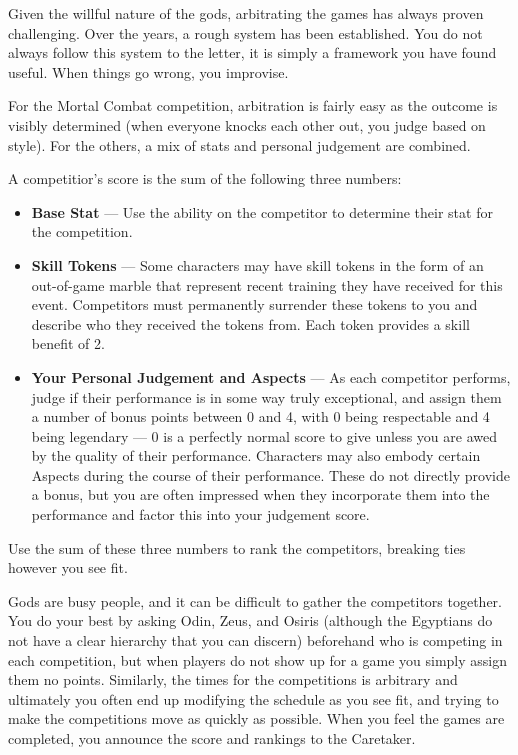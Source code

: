 \documentclass[green]{guardians}
\begin{document}
\name{\gArbiter{}}

Given the willful nature of the gods, arbitrating the games has always proven challenging. Over the years, a rough system has been established. You do not always follow this system to the letter, it is simply a framework you have found useful. When things go wrong, you improvise.

For the Mortal Combat competition, arbitration is fairly easy as the outcome is visibly determined (when everyone knocks each other out, you judge based on style). For the others, a mix of stats and personal judgement are combined.

A competitior's score is the sum of the following three numbers:

\begin{itemize}
  \item \textbf{Base Stat} --- Use the \aExamine{} ability on the competitor to determine their stat for the competition.
  \item \textbf{Skill Tokens} --- Some characters may have skill tokens in the form of an out-of-game marble that represent recent training they have received for this event. Competitors must permanently surrender these tokens to you and describe who they received the tokens from. Each token provides a skill benefit of 2.
  \item \textbf{Your Personal Judgement and Aspects} --- As each competitor performs, judge if their performance is in some way truly exceptional, and assign them a number of bonus points between 0 and 4, with 0 being respectable and 4 being legendary --- 0 is a perfectly normal score to give unless you are awed by the quality of their performance. Characters may also embody certain Aspects during the course of their performance. These do not directly provide a bonus, but you are often impressed when they incorporate them into the performance and factor this into your judgement score.
	
\end{itemize}

Use the sum of these three numbers to rank the competitors, breaking ties however you see fit.

Gods are busy people, and it can be difficult to gather the competitors together. You do your best by asking Odin, Zeus, and Osiris (although the Egyptians do not have a clear hierarchy that you can discern) beforehand who is competing in each competition, but when players do not show up for a game you simply assign them no points. Similarly, the times for the competitions is arbitrary and ultimately you often end up modifying the schedule as you see fit, and trying to make the competitions move as quickly as possible. When you feel the games are completed, you announce the score and rankings to the Caretaker.
\end{document}
